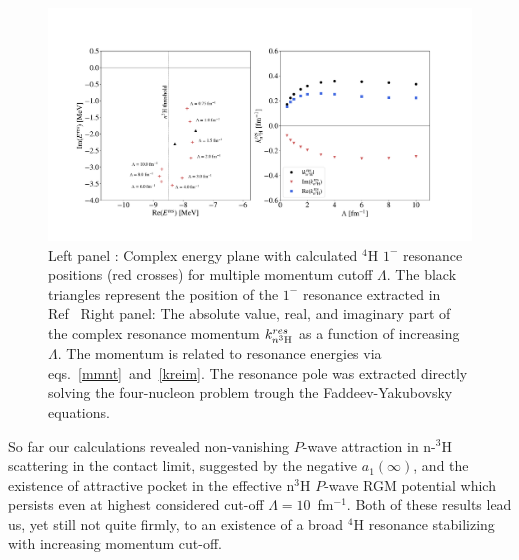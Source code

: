 \documentclass[5p,times]{elsarticle}
\begin{document}
\begin{figure}
\centering
  \includegraphics[width=.98\linewidth]{Graphs/resonance.pdf}
  \caption{ Left panel : Complex energy plane with calculated $^4$H $1^-$ resonance positions (red crosses) for multiple momentum cutoff $\Lambda$. 
  The black triangles represent the position of the $1^-$ resonance extracted in Ref~\cite{Lazauskas:2019cxj}
  Right panel: The absolute value, real, and imaginary part of the complex resonance momentum $k^{res}_{n ^3{\rm H}}$ as a function of increasing $\Lambda$. The momentum is related to resonance energies via eqs.~\ref{mmnt}~and~\ref{kreim}. The resonance pole was extracted directly solving the four-nucleon problem trough the Faddeev-Yakubovsky equations.}
  \label{fig:Pole_PositionN}
\end{figure}

%
So far our calculations revealed non-vanishing $P$-wave attraction in n-$^3$H scattering in the contact limit, suggested by the negative $a_1(\infty)$, and the existence of attractive pocket in the effective n$^3$H $P$-wave RGM potential which persists even at highest considered cut-off $\Lambda=10$~fm$^{-1}$. Both of these results lead us, yet still not quite firmly, to an existence of a broad $^4$H resonance stabilizing with increasing momentum cut-off. 
%
\end{document}
